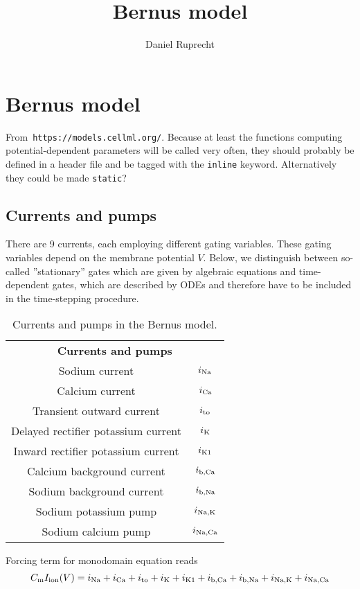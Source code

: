 \documentclass{scrartcl}
\def\sodcurr {$i_{\rm Na}$}
\def\calcurr {$i_{\rm Ca}$}
\def\tocurr {$i_{\rm to}$}
\def\potcurr {$i_{\rm K}$}
\def\pincurr {$i_{\rm K1}$}
\def\cabacurr { $i_{\rm b, Ca}$ }
\def\nabacurr { $i_{\rm b, Na}$ }
\def\napopump { $i_{\rm Na, K}$ }
\def\nacapump{ $i_{\rm Na, Ca}$ }
\begin{document}
\title{Bernus model}
\author{Daniel Ruprecht}

\maketitle

\section{Bernus model}
From~\texttt{https://models.cellml.org/}. 
Because at least the functions computing potential-dependent parameters will be called very often, they should probably be defined in a header file and be tagged with the \texttt{inline} keyword. Alternatively they could be made \texttt{static}?

\subsection{Currents and pumps}
There are 9 currents, each employing different gating variables. 
These gating variables depend on the membrane potential $V$.
Below, we distinguish between so-called ''stationary'' gates which are given by algebraic equations and time-dependent gates, which are described by ODEs and therefore have to be included in the time-stepping procedure.
\begin{table}[th]
\centering
\begin{tabular}{cc}
\multicolumn{2}{c}{\bf Currents and pumps}\\
Sodium current & \sodcurr \\
Calcium current & \calcurr \\
Transient outward current & \tocurr \\
Delayed rectifier potassium current & \potcurr \\
Inward rectifier potassium current & \pincurr \\
Calcium background current & \cabacurr \\
Sodium background current & \nabacurr \\
Sodium potassium pump & \napopump \\
Sodium calcium pump & \nacapump
\end{tabular}
%
\caption{Currents and pumps in the Bernus model.}
\end{table}
Forcing term for monodomain equation reads
\begin{equation}
	C_{\rm m} I_{\rm ion}(V) = i_{\rm Na} + i_{\rm Ca} + i_{\rm to} + i_{\rm K} + i_{\rm K1} +  i_{\rm b, Ca} + i_{\rm b, Na}  + i_{\rm Na, K} + i_{\rm Na, Ca}
\end{equation}
\end{document}
